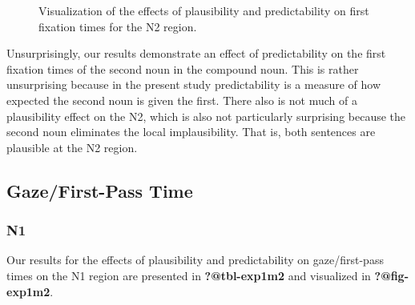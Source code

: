 \documentclass[
  letterpaper,
  DIV=11,
  numbers=noendperiod,
  nottoc,
  oneside]{scrreprt}
\begin{document}
\begin{figure}


\caption{\label{fig-firstfixn2}Visualization of the effects of
plausibility and predictability on first fixation times for the N2
region.}

\end{figure}%

Unsurprisingly, our results demonstrate an effect of predictability on
the first fixation times of the second noun in the compound noun. This
is rather unsurprising because in the present study predictability is a
measure of how expected the second noun is given the first. There also
is not much of a plausibility effect on the N2, which is also not
particularly surprising because the second noun eliminates the local
implausibility. That is, both sentences are plausible at the N2 region.

\subsection{Gaze/First-Pass Time}\label{gazefirst-pass-time}

\subsubsection{N1}\label{n1-1}

Our results for the effects of plausibility and predictability on
gaze/first-pass times on the N1 region are presented in
\textbf{?@tbl-exp1m2} and visualized in \textbf{?@fig-exp1m2}.
\end{document}
